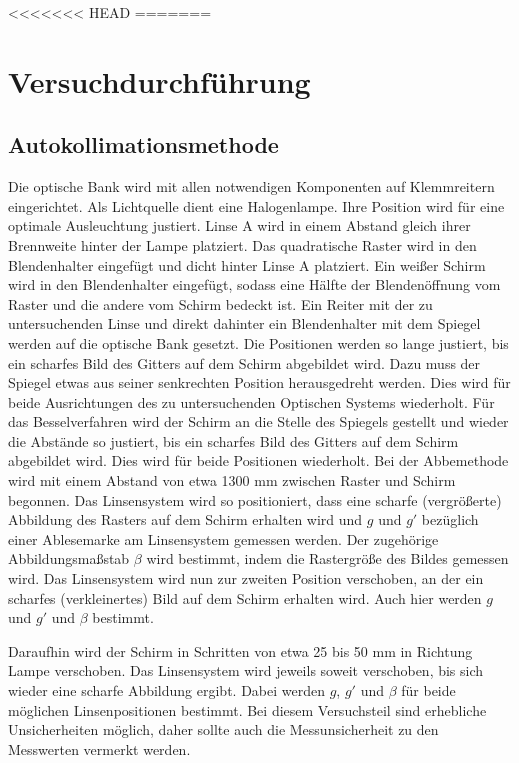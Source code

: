 \documentclass[11pt, a4paper]{article}
\begin{document}
<<<<<<< HEAD
=======
    \section{Versuchdurchführung}

    \subsection{Autokollimationsmethode} %

    Die optische Bank wird mit allen notwendigen Komponenten auf Klemmreitern eingerichtet. Als Lichtquelle dient eine Halogenlampe. Ihre Position wird für eine optimale Ausleuchtung justiert. Linse A wird in einem Abstand gleich ihrer Brennweite hinter der Lampe platziert. Das quadratische Raster wird in den Blendenhalter eingefügt und dicht hinter Linse A platziert. Ein weißer Schirm wird in den Blendenhalter eingefügt, sodass eine Hälfte der Blendenöffnung vom Raster und die andere vom Schirm bedeckt ist. Ein Reiter mit der zu untersuchenden Linse und direkt dahinter ein Blendenhalter mit dem Spiegel werden auf die optische Bank gesetzt. Die Positionen werden so lange justiert, bis ein scharfes Bild des Gitters auf dem Schirm abgebildet wird. Dazu muss der Spiegel etwas aus seiner senkrechten Position herausgedreht werden. Dies wird für beide Ausrichtungen des zu untersuchenden Optischen Systems wiederholt.
    Für das Besselverfahren wird der Schirm an die Stelle des Spiegels gestellt und wieder die Abstände so justiert, bis ein scharfes Bild des Gitters auf dem Schirm abgebildet wird. Dies wird für beide Positionen wiederholt.
    Bei der Abbemethode wird mit einem Abstand von etwa 1300 mm zwischen Raster und Schirm begonnen. Das Linsensystem wird so positioniert, dass eine scharfe (vergrößerte) Abbildung des Rasters auf dem Schirm erhalten wird und $g$ und $g'$ bezüglich einer Ablesemarke am Linsensystem gemessen werden. Der zugehörige Abbildungsmaßstab $\beta$ wird bestimmt, indem die Rastergröße des Bildes gemessen wird. Das Linsensystem wird nun zur zweiten Position verschoben, an der ein scharfes (verkleinertes) Bild auf dem Schirm erhalten wird. Auch hier werden $g$ und $g'$ und $\beta$ bestimmt.

    Daraufhin wird der Schirm in Schritten von etwa 25 bis 50 mm in Richtung Lampe verschoben. Das Linsensystem wird jeweils soweit verschoben, bis sich wieder eine scharfe Abbildung ergibt. Dabei werden $g$, $g'$ und $\beta$ für beide möglichen Linsenpositionen bestimmt. Bei diesem Versuchsteil sind erhebliche Unsicherheiten möglich, daher sollte auch die Messunsicherheit zu den Messwerten vermerkt werden.
\end{document}
